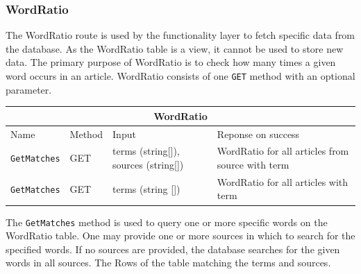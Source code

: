 \subsubsection{WordRatio}
The WordRatio route is used by the functionality layer to fetch specific data from the database.
As the WordRatio table is a view, it cannot be used to store new data. 
The primary purpose of WordRatio is to check how many times a given word occurs in an article.
WordRatio consists of one \texttt{GET} method with an optional parameter. 
\begin{table}[h]
    \begin{tabular}{|llll|}
    \hline
    \multicolumn{4}{|c|}{\textbf{WordRatio}}                                                                                                                                           \\ \hline
        \multicolumn{1}{|l|}{Name} &
        \multicolumn{1}{l|}{Method} &
        \multicolumn{1}{l|}{Input} &
        Reponse on success \\ 
    \hline
        \multicolumn{1}{|l|}{\texttt{GetMatches}} &
        \multicolumn{1}{l|}{GET} &
        \multicolumn{1}{l|}{terms (string[]), sources (string[])} &
        WordRatio for all articles from source with term \\
    \hline
        \multicolumn{1}{|l|}{\texttt{GetMatches}} &
        \multicolumn{1}{l|}{GET} &
        \multicolumn{1}{l|}{terms (string [])} &
        WordRatio for all articles with term \\
    \hline
    \end{tabular}
\end{table}

The \texttt{GetMatches} method is used to query one or more specific words on the WordRatio table.
One may provide one or more sources in which to search for the specified words.
If no sources are provided, the database searches for the given words in all sources.
The Rows of the table matching the terms and sources.


